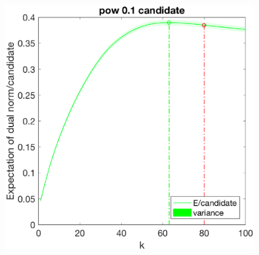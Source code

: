 \documentclass[12pt]{article}
\begin{document}
\begin{figure}[h]
\begin{minipage}[c]{.3\linewidth}
    \end{minipage}
    \hfill%
    \begin{minipage}[c]{.3\linewidth}
        \centering
        \includegraphics[width=\linewidth]{Fig/dualnorm-u0rand-k0-80-candidatepow.eps}
    \end{minipage}
\end{figure}
\end{document}
